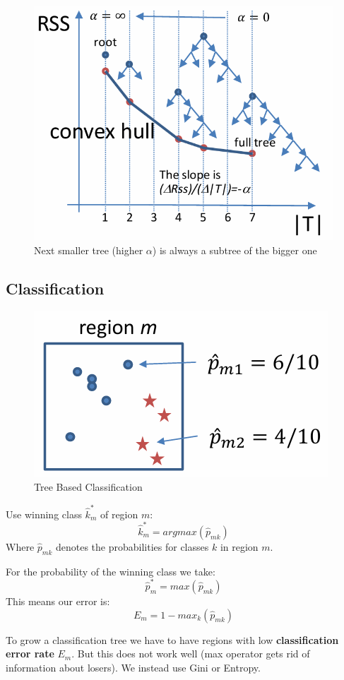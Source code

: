 \documentclass[../Main.tex]{subfiles}
\begin{document}
\begin{figure}[H]
    \centering
    \includegraphics[width=0.5\linewidth]{Images/tree-pruning-optimally.png}
    \caption{Next smaller tree (higher \(\alpha\)) is always a subtree of the bigger one}
\end{figure}

\subsection{Classification}

\begin{figure}[H]
    \centering
    \includegraphics[width=0.5\linewidth]{Images/tree-based-classification.png}
    \caption{Tree Based Classification}
\end{figure}

Use winning class \(\hat{k}_m^*\) of region \(m\):
\begin{equation}
    \hat{k}_m^* = argmax(\hat{p}_{mk})
\end{equation}
Where \(\hat{p}_{mk}\) denotes the probabilities for classes \(k\) in region \(m\).

For the probability of the winning class we take:
\begin{equation}
    \hat{p}_m^* = max(\hat{p}_{mk})
\end{equation}
This means our error is:
\begin{equation}
    E_m = 1-max_k(\hat{p}_{mk})
\end{equation}

To grow a classification tree we have to have regions with low \textbf{classification error rate} \(E_m\).
But this does not work well (max operator gets rid of information about losers).
We instead use Gini or Entropy.
\end{document}
